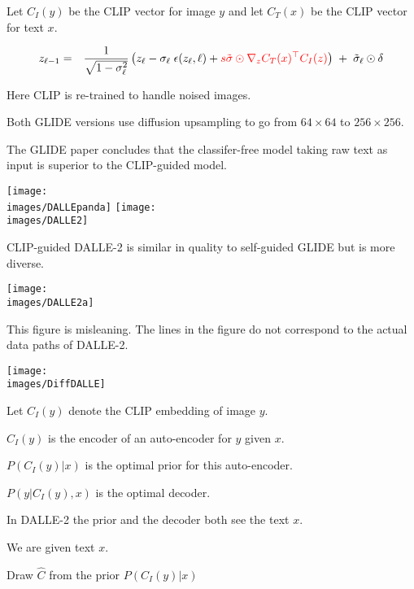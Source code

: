 {

Let $C_I(y)$ be the CLIP vector for image $y$ and let $C_T(x)$ be the CLIP vector for text $x$.

{\huge
\begin{eqnarray*}
z_{\ell-1}  & = & \frac{1}{\sqrt{1-\sigma_\ell^2}}\left(z_\ell - \sigma_\ell\; \epsilon(z_\ell,\ell) + {\color{red} s \tilde{\sigma}\odot\nabla_{z} C_T(x)^\top C_I(z)}\right)\; +\; \tilde{\sigma}_\ell\odot\delta
\end{eqnarray*}
}

\vfill
Here CLIP is re-trained to handle noised images.


Both GLIDE versions use diffusion upsampling to go from $64 \times 64$ to $256 \times 256$.

\vfill
The GLIDE paper concludes that the classifer-free model taking raw text as input is superior to the CLIP-guided model.


\centerline{\hfill \texttt{[image: \\images/DALLEpanda]} \hfill \texttt{[image: \\images/DALLE2]}}

CLIP-guided DALLE-2 is similar in quality to self-guided GLIDE but is more diverse.


\vfill
\centerline{\texttt{[image: \\images/DALLE2a]}}

This figure is misleaning.  The lines in the figure do not correspond to the actual data paths of DALLE-2.


\centerline{\texttt{[image: \\images/DiffDALLE]}}

\vfill
Let $C_I(y)$ denote the CLIP embedding of image $y$.

\vfill
$C_I(y)$ is the encoder of an auto-encoder for $y$ given $x$.

\vfill
$P(C_I(y)|x)$ is the optimal prior for this auto-encoder.

\vfill
$P(y|C_I(y),x)$ is the optimal decoder.

\vfill
In DALLE-2 the prior and the decoder both see the text $x$.


We are given text $x$.

\vfill
Draw $\hat{C}$ from the prior $P(C_I(y)|x)$

}
